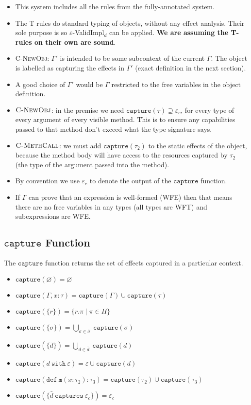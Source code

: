 \documentclass{llncs}
\newcommand{\keywadj}[1]{\mathtt{#1}}
\newcommand{\keyw}[1]{\keywadj{#1}~}
\newcommand{\kwa}[1]{\keywadj{ #1 }}
\begin{document}
\begin{itemize}
	\item This system includes all the rules from the fully-annotated system.
	\item The \textsc{T} rules do standard typing of objects, without any effect analysis. Their sole purpose is so $\varepsilon$-ValidImpl$_d$ can be applied. \textbf{We are assuming the T-rules on their own are sound}.
	\item \textsc{C-NewObj}: $\Gamma'$ is intended to be some subcontext of the current $\Gamma$. The object is labelled as capturing the effects in $\Gamma'$ (exact definition in the next section).
		\item A good choice of $\Gamma'$ would be $\Gamma$ restricted to the free variables in the object definition.
	\item $\textsc{C-NewObj}$: in the premise we need $\kwa{capture}(\tau) \supseteq \varepsilon_c$, for every type of every argument of every visible method. This is to ensure any capabilities passed to that method don't exceed what the type signature says.
	\item $\textsc{C-MethCall}$: we must add $\keywadj{capture}(\tau_2)$ to the static effects of the object, because the method body will have access to the resources captured by $\tau_2$ (the type of the argument passed into the method).
	\item By convention we use $\varepsilon_c$ to denote the output of the $\keywadj{capture}$ function.
		\item If $\Gamma$ can prove that an expression is well-formed (WFE) then that means there are no free variables in any types (all types are WFT) and subexpressions are WFE.
\end{itemize}

\subsection{$\keywadj{capture}$ Function}

\noindent
The $\keywadj{capture}$ function returns the set of effects captured in a particular context.

\begin{itemize}
	\item $\kwa{capture}(\varnothing) = \varnothing$
	\item $\kwa{capture}(\Gamma, x : \tau) = \kwa{capture}(\Gamma) \cup \kwa{capture}(\tau)$
	\item $\kwa{capture}(\{r\}) = \{ r.\pi \mid \pi \in \Pi \}$
	\item $\kwa{capture}(\{\bar \sigma\}) = \bigcup_{\sigma \in \bar \sigma}~\kwa{capture}(\sigma)$
	\item $\kwa{capture}(\{\bar d\}) = \bigcup_{d \in \bar d}~\kwa{capture}(d)$
	\item $\kwa{capture}(d~\keyw{with} \varepsilon) = \varepsilon \cup \kwa{capture}(d)$
	\item $\kwa{capture}(\keywadj{def~m}(x : \tau_2) : \tau_3) = \kwa{capture}(\tau_2) \cup \kwa{capture}(\tau_3)$
	\item $\kwa{capture}(\{\bar d ~\keyw{captures} \varepsilon_c\}) = \varepsilon_c$
\end{itemize}
\end{document}
